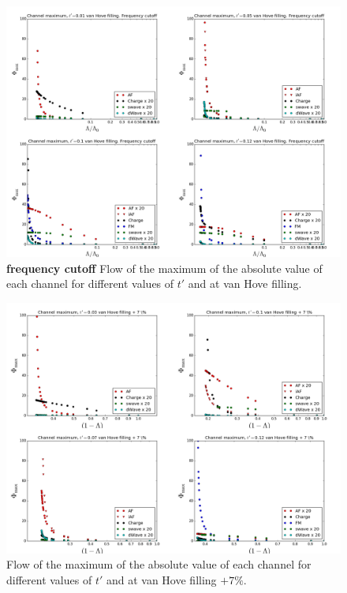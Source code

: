\begin{figure}
\includegraphics[scale=0.32,angle =90]{images/freqvanhove.png}
\caption{\textbf{frequency cutoff} Flow of the maximum of the absolute value of each channel for different values of $t'$ and at van Hove filling. } 
\label{freqlam} 
\end{figure}

\begin{figure}
\includegraphics[scale=0.32,angle =90]{images/vanhovepluslambda.png}
\caption{Flow of the maximum of the absolute value of each channel for different values of $t'$ and at van Hove filling $+7 \%$.
} 
\label{lamvanplus} 
\end{figure}

